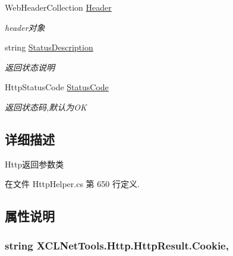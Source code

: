 \begin{DoxyCompactItemize}
Web\-Header\-Collection \hyperlink{class_x_c_l_net_tools_1_1_http_1_1_http_result_a332863b39f9b28f275a43048a91754ba}{Header}
\begin{DoxyCompactList}\small\item\em header对象 \end{DoxyCompactList}\item 
string \hyperlink{class_x_c_l_net_tools_1_1_http_1_1_http_result_a365c2a2bd1deb98cde343b1123752d9c}{Status\-Description}
\begin{DoxyCompactList}\small\item\em 返回状态说明 \end{DoxyCompactList}\item 
Http\-Status\-Code \hyperlink{class_x_c_l_net_tools_1_1_http_1_1_http_result_a2790d609062ed072dbc4a40a82d9f32c}{Status\-Code}
\begin{DoxyCompactList}\small\item\em 返回状态码,默认为\-O\-K \end{DoxyCompactList}\end{DoxyCompactItemize}


\subsection{详细描述}
Http返回参数类 



在文件 Http\-Helper.\-cs 第 650 行定义.



\subsection{属性说明}
\hypertarget{class_x_c_l_net_tools_1_1_http_1_1_http_result_a2c37e2f1cd87f1a6ebb3120752019d6a}{
\subsubsection[{Cookie}]{\setlength{\rightskip}{0pt plus 5cm}string X\-C\-L\-Net\-Tools.\-Http.\-Http\-Result.\-Cookie\hspace{0.3cm}{\ttfamily [get]}, {\ttfamily [set]}}}\label{class_x_c_l_net_tools_1_1_http_1_1_http_result_a2c37e2f1cd87f1a6ebb3120752019d6a}


